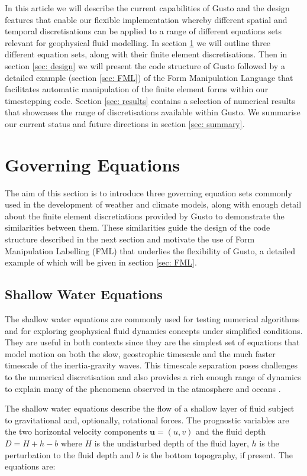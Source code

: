 \documentclass[11pt, a4paper]{article}
\def\MM#1{\boldsymbol{#1}}
\begin{document}
In this article we will describe the current capabilities of Gusto and
the design features that enable our flexible implementation whereby
different spatial and temporal discretisations can be applied to a
range of different equations sets relevant for geophysical fluid
modelling. In section \ref{sec: governing} we will outline three
different equation sets, along with their finite element
discretisations. Then in section \ref{sec: design} we will present the
code structure of Gusto followed by a detailed example (section
\ref{sec: FML}) of the Form Manipulation Language that facilitates
automatic manipulation of the finite element forms within our
timestepping code. Section \ref{sec: results} contains a selection of
numerical results that showcases the range of discretisations
available within Gusto. We summarise our current status and future
directions in section \ref{sec: summary}.

\section{Governing Equations}
\label{sec: governing}

The aim of this section is to introduce three governing equation sets
commonly used in the development of weather and climate models, along
with enough detail about the finite element discretiations provided by
Gusto to demonstrate the similarities between them. These similarities
guide the design of the code structure described in the next section
and motivate the use of Form Manipulation Labelling (FML) that
underlies the flexibility of Gusto, a detailed example of which will
be given in section \ref{sec: FML}.

\subsection{Shallow Water Equations}
The shallow water equations are commonly used for testing numerical
algorithms and for exploring geophysical fluid dynamics concepts under
simplified conditions. They are useful in both contexts since they are
the simplest set of equations that model motion on both the slow,
geostrophic timescale and the much faster timescale of the
inertia-gravity waves. This timescale separation poses challenges to
the numerical discretisation and also provides a rich enough range of
dynamics to explain many of the phenomena observed in the atmosphere
and oceans \citep{zeitlin2018geophysical}.

The shallow water equations describe the flow of a shallow layer of
fluid subject to gravitational and, optionally, rotational forces. The
prognostic variables are the two horizontal velocity components
$\MM{u} = (u, v)$ and the fluid depth $D = H + h - b$ where $H$ is the
undisturbed depth of the fluid layer, $h$ is the perturbation to the
fluid depth and $b$ is the bottom topography, if present. The
equations are:
\end{document}
